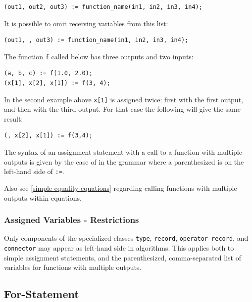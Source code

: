 \begin{lstlisting}[language=modelica]
(out1, out2, out3) := function_name(in1, in2, in3, in4);
\end{lstlisting}

It is possible to omit receiving variables from this list:
\begin{lstlisting}[language=modelica]
(out1, , out3) := function_name(in1, in2, in3, in4);
\end{lstlisting}

\begin{example}
The function \lstinline!f! called below has three outputs and two inputs:
\begin{lstlisting}[language=modelica]
(a, b, c) := f(1.0, 2.0);
(x[1], x[2], x[1]) := f(3, 4);
\end{lstlisting}
In the second example above \lstinline!x[1]! is assigned twice: first with the first output, and then with the third output.
For that case the following will give the same result:
\begin{lstlisting}[language=modelica]
(, x[2], x[1]) := f(3,4);
\end{lstlisting}
\end{example}

The syntax of an assignment statement with a call to a function with multiple outputs is given by the case of  in the grammar where a parenthesized  is on the left-hand side of \lstinline!:=!.

\begin{nonnormative}
Also see \cref{simple-equality-equations} regarding calling functions with multiple outputs within equations.
\end{nonnormative}


\subsubsection{Assigned Variables - Restrictions}\label{restrictions-on-assigned-variables}\label{assigned-variables-restrictions}

Only components of the specialized classes \lstinline!type!, \lstinline!record!, \lstinline!operator record!, and \lstinline!connector! may appear as left-hand side in algorithms.
This applies both to simple assignment statements, and the parenthesized, comma-separated list of variables for functions with multiple outputs.


\subsection{For-Statement}\label{for-statement}

